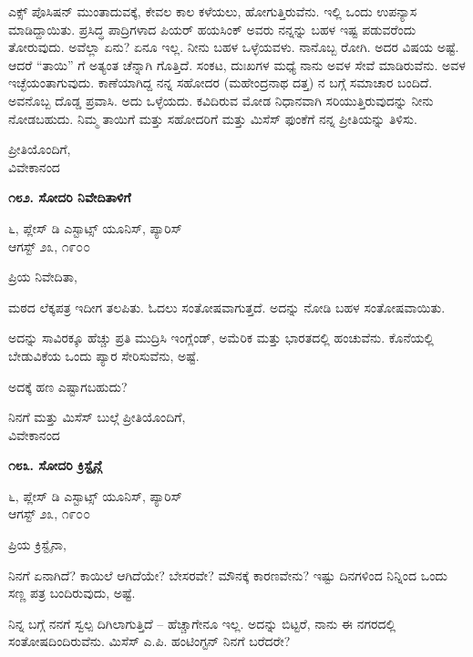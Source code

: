 ಎಕ್ಸ್ ಪೊಸಿಷನ್ ಮುಂತಾದುವಕ್ಕೆ, ಕೇವಲ ಕಾಲ ಕಳೆಯಲು, ಹೋಗುತ್ತಿರುವೆನು. ಇಲ್ಲಿ ಒಂದು ಉಪನ್ಯಾಸ ಮಾಡಿದ್ದಾಯಿತು. ಪ್ರಸಿದ್ಧ ಪಾದ್ರಿಗಳಾದ ಪಿಯರ್ ಹಯಸಿಂಕ್ ಅವರು ನನ್ನನ್ನು ಬಹಳ ಇಷ್ಟ ಪಡುವರೆಂದು ತೋರುವುದು. ಅವೆಲ್ಲಾ ಏನು? ಏನೂ ಇಲ್ಲ. ನೀನು ಬಹಳ ಒಳ್ಳೆಯವಳು. ನಾನೊಬ್ಬ ರೋಗಿ. ಅದರ ವಿಷಯ ಅಷ್ಟೆ. ಆದರೆ “ತಾಯಿ” ಗೆ ಅತ್ಯಂತ ಚೆನ್ನಾಗಿ ಗೊತ್ತಿದೆ. ಸಂಕಟ, ದುಃಖಗಳ ಮಧ್ಯೆ ನಾನು ಅವಳ ಸೇವೆ ಮಾಡಿರುವೆನು. ಅವಳ ಇಚ್ಛೆಯಂತಾಗುವುದು. ಕಾಣೆಯಾಗಿದ್ದ ನನ್ನ ಸಹೋದರ (ಮಹೇಂದ್ರನಾಥ ದತ್ತ) ನ ಬಗ್ಗೆ ಸಮಾಚಾರ ಬಂದಿದೆ. ಅವನೊಬ್ಬ ದೊಡ್ಡ ಪ್ರವಾಸಿ. ಅದು ಒಳ್ಳೆಯದು. ಕವಿದಿರುವ ಮೋಡ ನಿಧಾನವಾಗಿ ಸರಿಯುತ್ತಿರುವುದನ್ನು ನೀನು ನೋಡಬಹುದು. ನಿಮ್ಮ ತಾಯಿಗೆ ಮತ್ತು ಸಹೋದರಿಗೆ ಮತ್ತು ಮಿಸೆಸ್ ಫುಂಕೆಗೆ ನನ್ನ ಪ್ರೀತಿಯನ್ನು ತಿಳಿಸು.

\begin{flushright}
ಪ್ರೀತಿಯೊಂದಿಗೆ,\\ವಿವೇಕಾನಂದ
\end{flushright}

\begin{center}
\textbf{೧೮೨. ಸೋದರಿ ನಿವೇದಿತಾಳಿಗೆ}
\end{center}

\begin{flushright}
೬, ಪ್ಲೇಸ್ ಡಿ ಎಸ್ಟಾಟ್ಸ್ ಯೂನಿಸ್, ಪ್ಯಾರಿಸ್\\ಆಗಸ್ಟ್ ೨೩, ೧೯೦೦
\end{flushright}

ಪ್ರಿಯ ನಿವೇದಿತಾ,

ಮಠದ ಲೆಕ್ಕಪತ್ರ ಇದೀಗ ತಲಪಿತು. ಓದಲು ಸಂತೋಷವಾಗುತ್ತದೆ. ಅದನ್ನು ನೋಡಿ ಬಹಳ ಸಂತೋಷವಾಯಿತು.

ಅದನ್ನು ಸಾವಿರಕ್ಕೂ ಹೆಚ್ಚು ಪ್ರತಿ ಮುದ್ರಿಸಿ ಇಂಗ್ಲೆಂಡ್, ಅಮೆರಿಕ ಮತ್ತು ಭಾರತದಲ್ಲಿ ಹಂಚುವೆನು. ಕೊನೆಯಲ್ಲಿ ಬೇಡುವಿಕೆಯ ಒಂದು ಪ್ಯಾರ ಸೇರಿಸುವೆನು, ಅಷ್ಟೆ.

ಅದಕ್ಕೆ ಹಣ ಎಷ್ಟಾಗಬಹುದು?

\begin{flushright}
ನಿನಗೆ ಮತ್ತು ಮಿಸೆಸ್ ಬುಲ್ಗೆ ಪ್ರೀತಿಯೊಂದಿಗೆ,\\ವಿವೇಕಾನಂದ
\end{flushright}

\begin{center}
\textbf{೧೮೩. ಸೋದರಿ ಕ್ರಿಸ್ಟೈನ್ಗೆ}
\end{center}

\begin{flushright}
೬, ಪ್ಲೇಸ್ ಡಿ ಎಸ್ಟಾಟ್ಸ್ ಯೂನಿಸ್, ಪ್ಯಾರಿಸ್\\ಆಗಸ್ಟ್ ೨೩, ೧೯೦೦
\end{flushright}

ಪ್ರಿಯ ಕ್ರಿಸ್ಟೈನಾ,

ನಿನಗೆ ಏನಾಗಿದೆ? ಕಾಯಿಲೆ ಆಗಿದೆಯೇ? ಬೇಸರವೇ? ಮೌನಕ್ಕೆ ಕಾರಣವೇನು? ಇಷ್ಟು ದಿನಗಳಿಂದ ನಿನ್ನಿಂದ ಒಂದು ಸಣ್ಣ ಪತ್ರ ಬಂದಿರುವುದು, ಅಷ್ಟೆ.

ನಿನ್ನ ಬಗ್ಗೆ ನನಗೆ ಸ್ವಲ್ಪ ದಿಗಿಲಾಗುತ್ತಿದೆ – ಹೆಚ್ಚಾಗೇನೂ ಇಲ್ಲ. ಅದನ್ನು ಬಿಟ್ಟರೆ, ನಾನು ಈ ನಗರದಲ್ಲಿ ಸಂತೋಷದಿಂದಿರುವೆನು. ಮಿಸೆಸ್ ಎ.ಪಿ. ಹಂಟಿಂಗ್ಟನ್ ನಿನಗೆ ಬರೆದರೇ?

